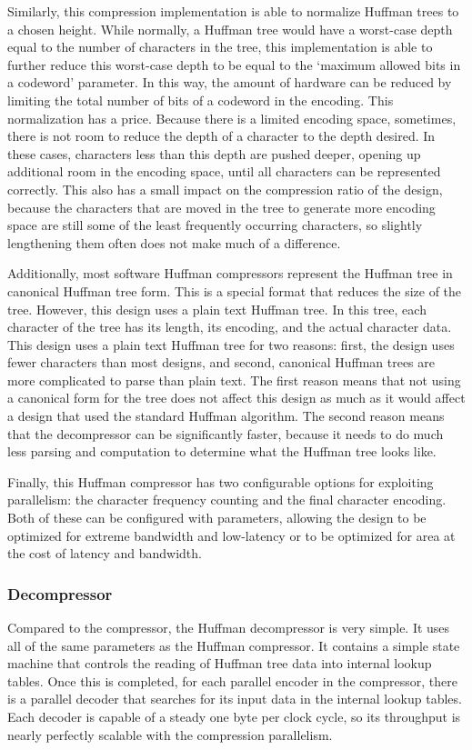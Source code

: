 \documentclass[doublespace,nopageskip]{VTthesis}
\begin{document}
Similarly, this compression implementation is able to normalize Huffman trees to a chosen height. While normally, a Huffman tree would have a worst-case depth equal to the number of characters in the tree, this implementation is able to further reduce this worst-case depth to be equal to the `maximum allowed bits in a codeword' parameter. In this way, the amount of hardware can be reduced by limiting the total number of bits of a codeword in the encoding. This normalization has a price. Because there is a limited encoding space, sometimes, there is not room to reduce the depth of a character to the depth desired. In these cases, characters less than this depth are pushed deeper, opening up additional room in the encoding space, until all characters can be represented correctly. This also has a small impact on the compression ratio of the design, because the characters that are moved in the tree to generate more encoding space are still some of the least frequently occurring characters, so slightly lengthening them often does not make much of a difference.

Additionally, most software Huffman compressors represent the Huffman tree in canonical Huffman tree form. This is a special format that reduces the size of the tree. However, this design uses a plain text Huffman tree. In this tree, each character of the tree has its length, its encoding, and the actual character data. This design uses a plain text Huffman tree for two reasons: first, the design uses fewer characters than most designs, and second, canonical Huffman trees are more complicated to parse than plain text. The first reason means that not using a canonical form for the tree does not affect this design as much as it would affect a design that used the standard Huffman algorithm. The second reason means that the decompressor can be significantly faster, because it needs to do much less parsing and computation to determine what the Huffman tree looks like. 

Finally, this Huffman compressor has two configurable options for exploiting parallelism: the character frequency counting and the final character encoding. Both of these can be configured with parameters, allowing the design to be optimized for extreme bandwidth and low-latency or to be optimized for area at the cost of latency and bandwidth.

\subsubsection{Decompressor}\label{sss:huffman_decompressor_design}
Compared to the compressor, the Huffman decompressor is very simple. It uses all of the same parameters as the Huffman compressor. It contains a simple state machine that controls the reading of Huffman tree data into internal lookup tables. Once this is completed, for each parallel encoder in the compressor, there is a parallel decoder that searches for its input data in the internal lookup tables. Each decoder is capable of a steady one byte per clock cycle, so its throughput is nearly perfectly scalable with the compression parallelism.
\end{document}
